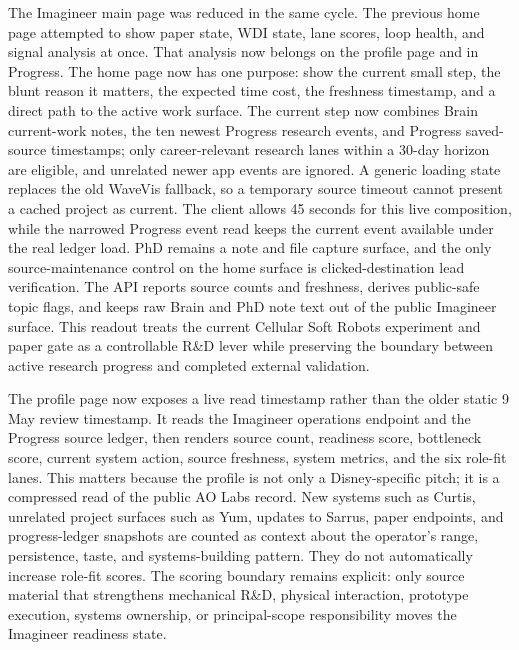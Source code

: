 \documentclass[12pt,letterpaper]{article}
\begin{document}
The Imagineer main page was reduced in the same cycle. The previous home page attempted to show paper state, WDI state, lane scores, loop health, and signal analysis at once. That analysis now belongs on the profile page and in Progress. The home page now has one purpose: show the current small step, the blunt reason it matters, the expected time cost, the freshness timestamp, and a direct path to the active work surface. The current step now combines Brain current-work notes, the ten newest Progress research events, and Progress saved-source timestamps; only career-relevant research lanes within a 30-day horizon are eligible, and unrelated newer app events are ignored. A generic loading state replaces the old WaveVis fallback, so a temporary source timeout cannot present a cached project as current. The client allows 45 seconds for this live composition, while the narrowed Progress event read keeps the current event available under the real ledger load. PhD remains a note and file capture surface, and the only source-maintenance control on the home surface is clicked-destination lead verification. The API reports source counts and freshness, derives public-safe topic flags, and keeps raw Brain and PhD note text out of the public Imagineer surface. This readout treats the current Cellular Soft Robots experiment and paper gate as a controllable R\&D lever while preserving the boundary between active research progress and completed external validation.

The profile page now exposes a live read timestamp rather than the older static 9 May review timestamp. It reads the Imagineer operations endpoint and the Progress source ledger, then renders source count, readiness score, bottleneck score, current system action, source freshness, system metrics, and the six role-fit lanes. This matters because the profile is not only a Disney-specific pitch; it is a compressed read of the public AO Labs record. New systems such as Curtis, unrelated project surfaces such as Yum, updates to Sarrus, paper endpoints, and progress-ledger snapshots are counted as context about the operator's range, persistence, taste, and systems-building pattern. They do not automatically increase role-fit scores. The scoring boundary remains explicit: only source material that strengthens mechanical R\&D, physical interaction, prototype execution, systems ownership, or principal-scope responsibility moves the Imagineer readiness state.
\end{document}
